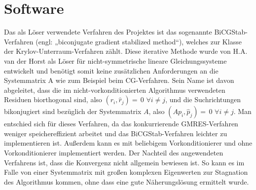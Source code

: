 \section{Software}

Das als Löser verwendete Verfahren des Projektes ist das sogenannte BiCGStab-Verfahren (engl: „biconjugate gradient stabilized method“), welches zur Klasse der Krylov-Unterraum-Verfahren zählt. Diese iterative Methode wurde von H.A. van der Horst als Löser für nicht-symmetrische lineare Gleichungssysteme entwickelt und benötigt somit keine zusätzlichen Anforderungen an die Systemmatrix A wie zum Beispiel beim CG-Verfahren. Sein Name ist davon abgeleitet, dass die im nicht-vorkonditionierten Algorithmus verwendeten Residuen biorthogonal sind, also $(r_i,\hat{r}_j)=\,0$ $\forall i\neq j$, und die Suchrichtungen bikonjugiert sind bezüglich der Systemmatrix $A$, also $(Ap_i,\hat{p}_j)=\,0$ $ \forall i \neq j$.  Man entschied sich für dieses Verfahren, da das konkurrierende GMRES-Verfahren weniger speichereffizient arbeitet und das BiCGStab-Verfahren leichter zu implementieren ist.  Au\ss{}erdem kann es mit beliebigem Vorkonditionierer und ohne Vorkonditionierer implementiert werden. Der Nachteil des angewendeten Verfahrens ist, dass die Konvergenz nicht allgemein bewiesen ist. So kann es im Falle von einer Systemmatrix mit großen komplexen Eigenwerten zur Stagnation des Algorithmus kommen, ohne dass eine gute Näherungslösung ermittelt wurde. \\



